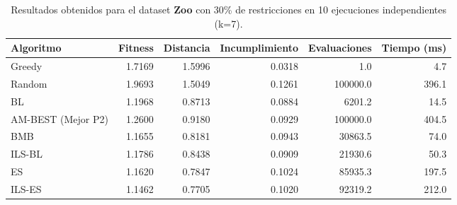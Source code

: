 \begin{table}[H]
    \centering
    \begin{tabular}{lrrrrr}
        \hline
        Algoritmo & Fitness & Distancia & Incumplimiento & Evaluaciones & Tiempo (ms)\\
        \hline
        Greedy & 1.7169 & 1.5996 & 0.0318 & 1.0 & 4.7 \\
        Random & 1.9693 & 1.5049 & 0.1261 & 100000.0 & 396.1 \\
        BL & 1.1968 & 0.8713 & 0.0884 & 6201.2 & 14.5 \\
        AM-BEST (Mejor P2) & 1.2600 & 0.9180 & 0.0929 & 100000.0 & 404.5 \\
        BMB & 1.1655 & 0.8181 & 0.0943 & 30863.5 & 74.0 \\
        ILS-BL & 1.1786 & 0.8438 & 0.0909 & 21930.6 & 50.3 \\
        ES & 1.1620 & 0.7847 & 0.1024 & 85935.3 & 197.5 \\
        ILS-ES & 1.1462 & 0.7705 & 0.1020 & 92319.2 & 212.0 \\
        \hline
    \end{tabular}
    \caption{Resultados obtenidos para el dataset \textbf{Zoo} con 30\% de restricciones en  10 ejecuciones independientes (k=7).}
    \label{tab:res_zoo_30}
\end{table}
